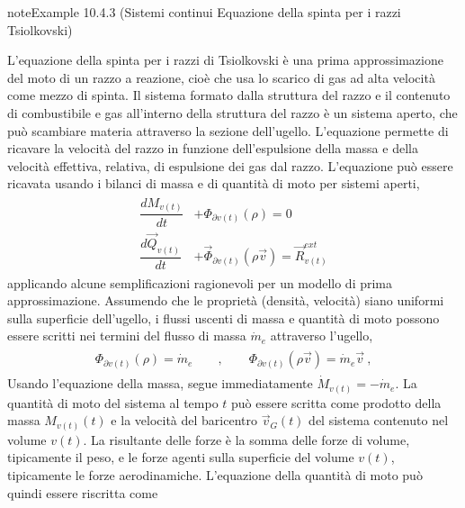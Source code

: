 \documentclass[letterpaper,10pt,italian]{jupyterBook}
\begin{document}
\begin{sphinxadmonition}{note}{Example 10.4.3 (Sistemi continui \sphinxhyphen{} Equazione della spinta per i razzi \sphinxhyphen{} Tsiolkovski)}



\sphinxAtStartPar
L’equazione della spinta per i razzi \sphinxhyphen{} di Tsiolkovski   \sphinxhyphen{} è una prima approssimazione del moto di un razzo a reazione, cioè che usa lo scarico di gas ad alta velocità come mezzo di spinta. Il sistema formato dalla struttura del razzo e il contenuto di combustibile e gas all’interno della struttura del razzo è un sistema aperto, che può scambiare materia attraverso la sezione dell’ugello. L’equazione permette di ricavare la velocità del razzo in funzione dell’espulsione della massa e della velocità effettiva, relativa, di espulsione dei gas dal razzo. L’equazione può essere ricavata usando i bilanci di massa e di quantità di moto per sistemi aperti,
\begin{equation*}
\begin{split}\begin{aligned}
  \dfrac{d M_{v(t)}}{dt} & + \Phi_{\partial v(t)}(\rho) = 0 \\
  \dfrac{d \vec{Q}_{v(t)}}{dt} & + \vec{\Phi}_{\partial v(t)}(\rho \vec{v}) = \vec{R}_{v(t)}^{ext}
\end{aligned}\end{split}
\end{equation*}
\sphinxAtStartPar
applicando alcune semplificazioni ragionevoli per un modello di prima approssimazione. Assumendo che le proprietà (densità, velocità) siano uniformi sulla superficie dell’ugello, i flussi uscenti di massa e quantità di moto possono essere scritti nei termini del flusso di massa \(\dot{m}_e\) attraverso l’ugello,
\begin{equation*}
\begin{split}\begin{aligned}
  \Phi_{\partial v(t)}(\rho) = \dot{m}_e \qquad , \qquad \Phi_{\partial v(t)}(\rho \vec{v}) = \dot{m}_e \vec{v} \ ,
\end{aligned}\end{split}
\end{equation*}
\sphinxAtStartPar
Usando l’equazione della massa, segue immediatamente \(\dot{M}_{v(t)} = - \dot{m}_e\).
La quantità di moto del sistema al tempo \(t\) può essere scritta come prodotto della massa \(M_{v(t)}(t)\) e la velocità del baricentro \(\vec{v}_G(t)\) del sistema contenuto nel volume \(v(t)\). La risultante delle forze è la somma delle forze di volume, tipicamente il peso, e le forze agenti sulla superficie del volume \(v(t)\), tipicamente le forze aerodinamiche. L’equazione della quantità di moto può quindi essere riscritta come

\end{sphinxadmonition}
\end{document}
